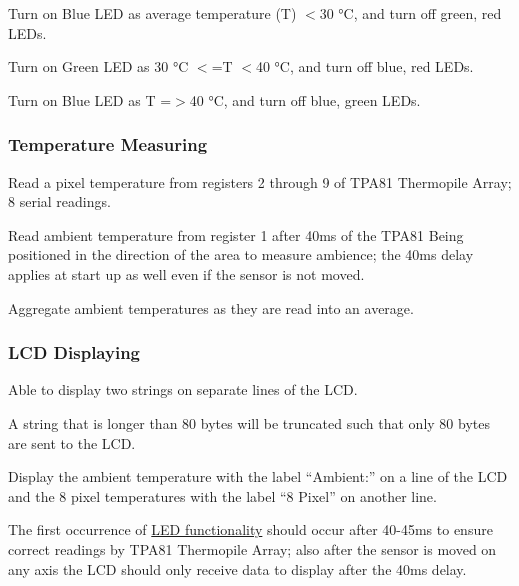 \begin{DoxyItemize}
\item Turn on Blue L\+ED as average temperature (T) $<$30 °C, and turn off green, red L\+E\+Ds.
\item Turn on Green L\+ED as 30 °C $<$=T $<$40 °C, and turn off blue, red L\+E\+Ds.
\item Turn on Blue L\+ED as T =$>$40 °C, and turn off blue, green L\+E\+Ds.
\end{DoxyItemize}\hypertarget{requirements_temp}{}\subsubsection{Temperature Measuring}\label{requirements_temp}

\begin{DoxyItemize}
\item Read a pixel temperature from registers 2 through 9 of T\+P\+A81 Thermopile Array; 8 serial readings.
\item Read ambient temperature from register 1 after 40ms of the T\+P\+A81 Being positioned in the direction of the area to measure ambience; the 40ms delay applies at start up as well even if the sensor is not moved.
\item Aggregate ambient temperatures as they are read into an average.
\end{DoxyItemize}\hypertarget{requirements_lcd}{}\subsubsection{L\+C\+D Displaying}\label{requirements_lcd}

\begin{DoxyItemize}
\item Able to display two strings on separate lines of the L\+CD.
\item A string that is longer than 80 bytes will be truncated such that only 80 bytes are sent to the L\+CD.
\item Display the ambient temperature with the label “\+Ambient\+:” on a line of the L\+CD and the 8 pixel temperatures with the label “8 Pixel” on another line.
\item The first occurrence of \hyperlink{requirements_led}{L\+ED functionality} should occur after 40-\/45ms to ensure correct readings by T\+P\+A81 Thermopile Array; also after the sensor is moved on any axis the L\+CD should only receive data to display after the 40ms delay.
\end{DoxyItemize}


